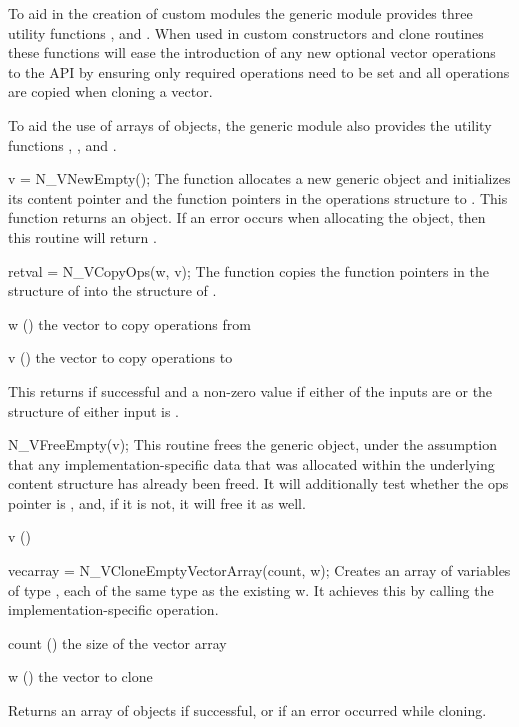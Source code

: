 To aid in the creation of custom {\nvector} modules the generic {\nvector}
module provides three  utility functions , 
and . When used in custom {\nvector} constructors and clone
routines these functions will ease the introduction of any new optional vector
operations to the {\nvector} API by ensuring only required operations need to
be set and all operations are copied when cloning a vector.

To aid the use of arrays of {\nvector} objects, the generic {\nvector} module
also provides the utility functions ,
, and .


{
  v = N\_VNewEmpty();
}
{
  The function  allocates a new generic {\nvector} object and
  initializes its content pointer and the function pointers in the operations
  structure to .
}
{}
{
  This function returns an  object. If an error occurs when
  allocating the object, then this routine will return .
}
{}
{}

{
  retval = N\_VCopyOps(w, v);
}
{
  The function  copies the function pointers in the 
  structure of  into the  structure of .
}
{
  \begin{args}[w]
  \item[w] () the vector to copy operations from
  \item[v] () the vector to copy operations to
  \end{args}
}
{
  This returns  if successful and a non-zero value if either of the inputs
  are  or the  structure of either input is .
}
{}

{
  N\_VFreeEmpty(v);
}
{
  This routine frees the generic  object, under the assumption that any
  implementation-specific data that was allocated within the underlying content structure
  has already been freed. It will additionally test whether the ops pointer is , 
  and, if it is not, it will free it as well.
}
{
  \begin{args}[v]
  \item[v] ()
  \end{args}
}
{}
{}

{
  vecarray = N\_VCloneEmptyVectorArray(count, w);
}
{
  Creates an array of  variables of type ,
  each of the same type as the existing  w. It achieves
  this by calling the implementation-specific  operation.
}
{
  \begin{args}[count]
  \item[count] () the size of the vector array
  \item[w] () the vector to clone
  \end{args}
}
{
  Returns an array of   objects if successful, or
   if an error occurred while cloning.
}
{}

